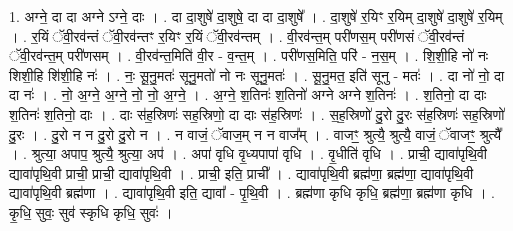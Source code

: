 \documentclass[17pt]{extarticle}
\begin{document}
1. अग्ने॒ दा दा अग्ने ऽग्ने॒ दाः । . दा दा॒शुषे॑ दा॒शुषे॒ दा दा दा॒शुषे᳚ । . दा॒शुषे॑ र॒यिꣳ र॒यिम् दा॒शुषे॑ दा॒शुषे॑ र॒यिम् । . र॒यिं ॅवी॒रव॑न्तं ॅवी॒रव॑न्तꣳ र॒यिꣳ र॒यिं ॅवी॒रव॑न्तम् । . वी॒रव॑न्त॒म् परी॑णस॒म् परी॑णसं ॅवी॒रव॑न्तं ॅवी॒रव॑न्त॒म् परी॑णसम् । . वी॒रव॑न्त॒मिति॑ वी॒र - व॒न्त॒म् । . परी॑णस॒मिति॒ परि॑ - न॒स॒म् । . शि॒शी॒हि नो॑ नः शिशी॒हि शि॑शी॒हि नः॑ । . नः॒ सू॒नु॒मतः॑ सूनु॒मतो॑ नो नः सूनु॒मतः॑ । . सू॒नु॒मत॒ इति॑ सूनु - मतः॑ । . दा नो॑ नो॒ दा दा नः॑ । . नो॒ अ॒ग्ने॒ अ॒ग्ने॒ नो॒ नो॒ अ॒ग्ने॒ । . अ॒ग्ने॒ श॒तिनः॑ श॒तिनो॑ अग्ने अग्ने श॒तिनः॑ । . श॒तिनो॒ दा दाः श॒तिनः॑ श॒तिनो॒ दाः । . दाः स॑ह॒स्रिणः॑ सह॒स्रिणो॒ दा दाः स॑ह॒स्रिणः॑ । . स॒ह॒स्रिणो॑ दु॒रो दु॒रः स॑ह॒स्रिणः॑ सह॒स्रिणो॑ दु॒रः । . दु॒रो न न दु॒रो दु॒रो न । . न वाजं॒ ॅवाज॒म् न न वाज᳚म् । . वाजꣳ॒॒ श्रुत्यै॒ श्रुत्यै॒ वाजं॒ ॅवाजꣳ॒॒ श्रुत्यै᳚ । . श्रुत्या॒ अपाप॒ श्रुत्यै॒ श्रुत्या॒ अप॑ । . अपा॑ वृधि वृ॒ध्यपापा॑ वृधि । . वृ॒धीति॑ वृधि । . प्राची॒ द्यावा॑पृथि॒वी द्यावा॑पृथि॒वी प्राची॒ प्राची॒ द्यावा॑पृथि॒वी । . प्राची॒ इति॒ प्राची᳚ । . द्यावा॑पृथि॒वी ब्रह्म॑णा॒ ब्रह्म॑णा॒ द्यावा॑पृथि॒वी द्यावा॑पृथि॒वी ब्रह्म॑णा । . द्यावा॑पृथि॒वी इति॒ द्यावा᳚ - पृ॒थि॒वी । . ब्रह्म॑णा कृधि कृधि॒ ब्रह्म॑णा॒ ब्रह्म॑णा कृधि । . कृ॒धि॒ सुवः॒ सुव॑ स्कृधि कृधि॒ सुवः॑ । \newline
\end{document}
